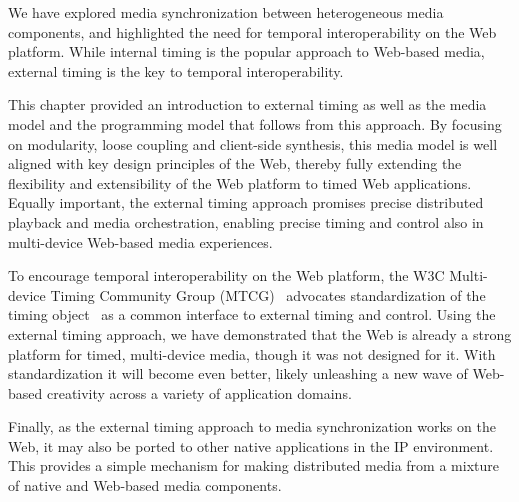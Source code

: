 We have explored media synchronization between heterogeneous media components,
and highlighted the need for temporal interoperability on the Web platform.
While internal timing is the popular approach to Web-based media, external
timing is the key to temporal interoperability.

This chapter provided an introduction to external timing as well as the media
model and the programming model that follows from this approach. By focusing
on modularity, loose coupling and client-side synthesis, this media model is
well aligned with key design principles of the Web, thereby fully extending
the flexibility and extensibility of the Web platform to timed Web
applications. Equally important, the external timing approach promises
precise distributed playback and media orchestration, enabling precise timing
and control also in multi-device Web-based media experiences.

To encourage temporal interoperability on the Web platform, the W3C Multi-
device Timing Community Group (MTCG)~\cite{mtcg} advocates standardization of
the timing object~\cite{timingobject} as a common interface to external timing
and control. Using the external timing approach, we have demonstrated that the
Web is already a strong platform for timed, multi-device media, though it was
not designed for it. With standardization it will become even better, likely
unleashing a new wave of Web-based creativity across a variety of application
domains.

Finally, as the external timing approach to media synchronization works on the
Web, it may also be ported to other native applications in the IP environment.
This provides a simple mechanism for making distributed media from a mixture
of native and Web-based media components.
